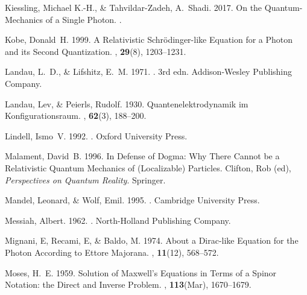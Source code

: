 \documentclass[12pt,secnumarabic,amsmath,amssymb,balancelastpage,nofootinbib]{article}
\begin{document}
\begin{thebibliography}{}
Kiessling, Michael K.-H., \& Tahvildar-Zadeh, A.~Shadi. 2017.
\newblock On the Quantum-Mechanics of a Single Photon.
.

Kobe, Donald~H. 1999.
\newblock A Relativistic Schr{\"o}dinger-like Equation for a Photon and its
  Second Quantization.
, {\bf 29}(8), 1203--1231.

Landau, L.~D., \& Lifshitz, E.~M. 1971.
. 3rd edn.
\newblock Addison-Wesley Publishing Company.

Landau, Lev, \& Peierls, Rudolf. 1930.
\newblock Quantenelektrodynamik im Konfigurationsraum.
, {\bf 62}(3), 188--200.

Lindell, Ismo~V. 1992.
.
\newblock Oxford University Press.

Malament, David~B. 1996.
\newblock In Defense of Dogma: Why There Cannot be a Relativistic Quantum
  Mechanics of (Localizable) Particles.
 Clifton, Rob (ed), {\em Perspectives on
  Quantum Reality}.
\newblock Springer.

Mandel, Leonard, \& Wolf, Emil. 1995.
.
\newblock Cambridge University Press.

Messiah, Albert. 1962.
.
\newblock North-Holland Publishing Company.

Mignani, E, Recami, E, \& Baldo, M. 1974.
\newblock About a Dirac-like Equation for the Photon According to Ettore
  Majorana.
, {\bf 11}(12), 568--572.

Moses, H.~E. 1959.
\newblock Solution of Maxwell's Equations in Terms of a Spinor Notation: the
  Direct and Inverse Problem.
, {\bf 113}(Mar), 1670--1679.


\end{thebibliography}
\end{document}

